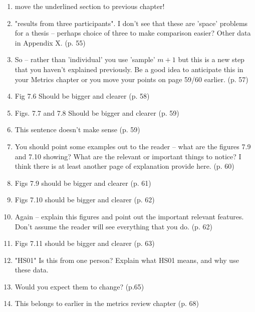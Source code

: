 \documentclass[10pt]{article}
\begin{document}
\begin{enumerate}[noitemsep,topsep=0pt]
\item move the underlined section to previous chapter!

\item "results from three participants". 
	I don't see that these are 'space' problems for a thesis
	-- perhaps choice of three to make comparison easier?
	Other data in Appendix X. (p. 55)



\item So -- rather than 'individual' you use 'sample' 
	$m+1$ 
	but this is a new step that you haven't explained previously.
	Be a good idea to anticipate this in your Metrics chapter
	or you move your points on page 59/60 earlier. (p. 57)


\item  Fig 7.6 Should be bigger and clearer	(p. 58)

\item  Figs. 7.7 and 7.8 Should be bigger and clearer	(p. 59)

\item This sentence doesn't make sense (p. 59)

\item You should point some examples out to the reader -- 
	what are the figures 7.9 and 7.10 showing?
	What are the relevant or important things to notice?
	I think there is at least another page of explanation 
	provide here. (p. 60)

\item Figs 7.9 should be bigger and clearer (p. 61)

\item Figs 7.10 should be bigger and clearer (p. 62)

\item Again -- explain this figures and point out the important 
	relevant features.
	Don't assume the reader will see everything that you do.
	(p. 62)



\item Figs 7.11 should be bigger and clearer (p. 63)

\item "HS01" Is this from one person? Explain what
	HS01 means, and why use these data.

\item Would you expect them to change? (p.65)

\item This belongs to earlier in the metrics review chapter (p. 68)


\end{enumerate}
\end{document}

